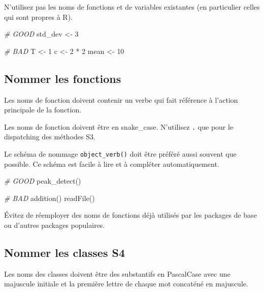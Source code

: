 \documentclass[
  french,
]{scrbook}
\newenvironment{Shaded}{\begin{snugshade}}{\end{snugshade}}
\newcommand{\CommentTok}[1]{\textcolor[rgb]{0.56,0.35,0.01}{\textit{#1}}}
\newcommand{\DecValTok}[1]{\textcolor[rgb]{0.00,0.00,0.81}{#1}}
\newcommand{\FunctionTok}[1]{\textcolor[rgb]{0.00,0.00,0.00}{#1}}
\newcommand{\NormalTok}[1]{#1}
\newcommand{\OtherTok}[1]{\textcolor[rgb]{0.56,0.35,0.01}{#1}}
\newcommand{\SpecialCharTok}[1]{\textcolor[rgb]{0.00,0.00,0.00}{#1}}
\begin{document}
N'utilisez pas les noms de fonctions et de variables existantes (en particulier celles qui sont propres à R).

\begin{Shaded}
\begin{Highlighting}[]
\CommentTok{\# GOOD}
\NormalTok{std\_dev }\OtherTok{\textless{}{-}} \DecValTok{3}

\CommentTok{\# BAD}
\NormalTok{T }\OtherTok{\textless{}{-}} \DecValTok{1}
\NormalTok{c }\OtherTok{\textless{}{-}} \DecValTok{2} \SpecialCharTok{*} \DecValTok{2}
\NormalTok{mean }\OtherTok{\textless{}{-}} \DecValTok{10}
\end{Highlighting}
\end{Shaded}

\hypertarget{nommer-les-fonctions}{%
\subsection{Nommer les fonctions}\label{nommer-les-fonctions}}

Les noms de fonction doivent contenir un verbe qui fait référence à l'action principale de la fonction.

Les noms de fonction doivent être en snake\_case. N'utilisez \texttt{.} que pour le dispatching des méthodes S3.

Le schéma de nommage \texttt{object\_verb()} doit être préféré aussi souvent que possible. Ce schéma est facile à lire et à compléter automatiquement.

\begin{Shaded}
\begin{Highlighting}[]
\CommentTok{\# GOOD}
\FunctionTok{peak\_detect}\NormalTok{()}

\CommentTok{\# BAD}
\FunctionTok{addition}\NormalTok{()}
\FunctionTok{readFile}\NormalTok{()}
\end{Highlighting}
\end{Shaded}

Évitez de réemployer des noms de fonctions déjà utilisés par les packages de base ou d'autres packages populaires.

\hypertarget{nommer-les-classes-s4}{%
\subsection{Nommer les classes S4}\label{nommer-les-classes-s4}}

Les noms des classes doivent être des substantifs en PascalCase avec une majuscule initiale et la première lettre de chaque mot concaténé en majuscule.
\end{document}
